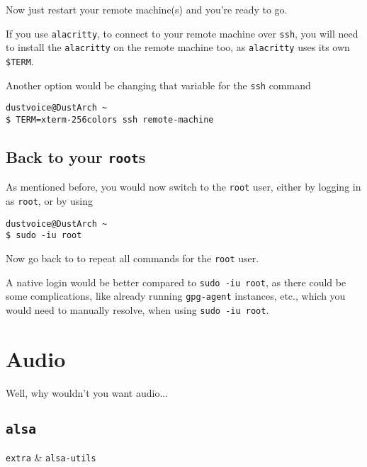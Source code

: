 \documentclass[10pt]{dustdoc}
\begin{document}
Now just restart your remote machine(s) and you’re ready to go.

\begin{NOTE}
    If you use \texttt{alacritty}, to connect to your remote machine over \texttt{ssh}, you will need to install the \texttt{alacritty} on the remote machine too, as \texttt{alacritty} uses its own \texttt{\$TERM}.

    Another option would be changing that variable for the \texttt{ssh} command

    \begin{verbatim}
dustvoice@DustArch ~
$ TERM=xterm-256colors ssh remote-machine
    \end{verbatim}
\end{NOTE}

\subsection{Back to your \texttt{root}s}
\label{sec:back-to-your-roots}

As mentioned before, you would now switch to the \texttt{root} user, either by logging in as \texttt{root}, or by using

\begin{verbatim}
dustvoice@DustArch ~
$ sudo -iu root
\end{verbatim}

Now go back to  to repeat all commands for the \texttt{root} user.

\begin{WARNING}
    A native login would be better compared to \texttt{sudo -iu root}, as there could be some complications, like already running \texttt{gpg-agent} instances, etc., which you would need to manually resolve, when using \texttt{sudo -iu root}.
\end{WARNING}

\section{Audio}
\label{sec:audio}

Well, why wouldn’t you want audio...

\subsection{\texttt{alsa}}
\label{sec:alsa}

\begin{packagetable}
    \texttt{extra} & \texttt{alsa-utils} \\
\end{packagetable}
\end{document}
